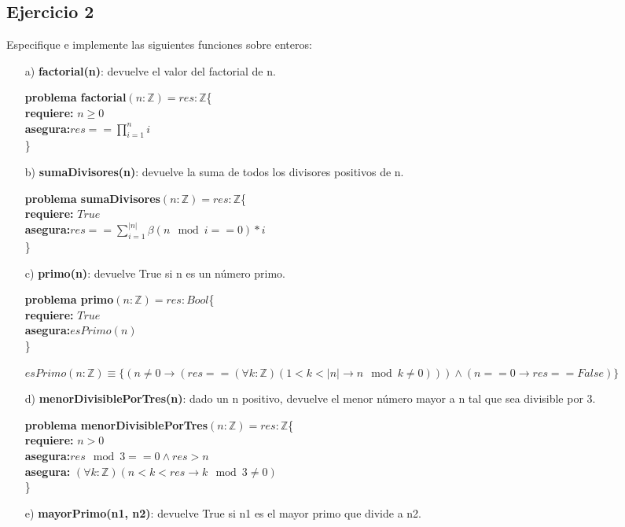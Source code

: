 \documentclass[10pt,a4paper]{article}
\begin{document}
\subsection*{Ejercicio 2}
Especifique e implemente las siguientes funciones sobre enteros:
\begin{enumerate}
\item[a)]\textbf{factorial(n)}: devuelve el valor del factorial de n.

\textbf{problema factorial}$(n : \mathbb{Z})=res:\mathbb{Z}$\{ \\
	\textbf{  requiere:} $n \geq 0$\\
	\textbf{  asegura:}$res == \prod_{i=1}^{n}i$\\
	\}

\item[b)]\textbf{sumaDivisores(n)}: devuelve la suma de todos los divisores positivos de n.

\textbf{problema sumaDivisores}$(n : \mathbb{Z})=res:\mathbb{Z}$\{ \\
	\textbf{  requiere:} $True$\\
	\textbf{  asegura:}$res == \sum_{i=1}^{|n|} \beta(n \mod i ==0)*i$\\
	\}
\item[c)]\textbf{primo(n)}: devuelve True si n es un número primo.

\textbf{problema primo}$(n : \mathbb{Z})=res:Bool$\{ \\
	\textbf{  requiere:} $True$\\
	\textbf{  asegura:}$esPrimo(n)$\\
	\}
	
	$esPrimo(n:\mathbb{Z})\equiv \{(n\not = 0 \rightarrow (res==(\forall k: \mathbb{Z})(1<k<|n|\rightarrow n \mod k \not = 0))) \wedge (n==0 \rightarrow res== False) \} $
\item[d)]\textbf{menorDivisiblePorTres(n)}: dado un n positivo, devuelve el menor número mayor a n tal que sea divisible por 3.

\textbf{problema menorDivisiblePorTres}$(n : \mathbb{Z})=res:\mathbb{Z}$\{ \\
	\textbf{  requiere:} $n>0$\\
	\textbf{  asegura:}$res \mod 3 ==0 \wedge res>n$\\
	\textbf{asegura:} $(\forall k:\mathbb{Z})(n<k<res \rightarrow k \mod 3\not = 0)$\\
	\}
\item[e)]\textbf{mayorPrimo(n1, n2)}: devuelve True si n1 es el mayor primo que divide a n2.


\end{enumerate}
\end{document}
